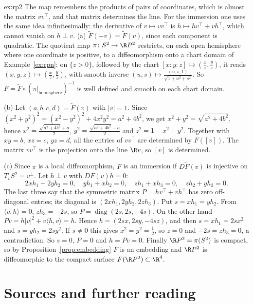 \begin{solution}{ex:rp2}
\idea The map remembers the products of pairs of coordinates, which is almost the matrix $vv^\top$, and that matrix determines the line. For the immersion
one uses the same idea infinitesimally: the derivative of $v\mapsto vv^\top$ is $h\mapsto hv^\top+vh^\top$, which cannot vanish on $h\perp v$.
\writeup (a) $\tilde F(-v)=\tilde F(v)$, since each component is quadratic. The quotient map $\pi\colon S^2\to\R P^2$ restricts, on each open hemisphere
where one coordinate is positive, to a diffeomorphism onto a chart domain of Example~\ref{ex:rpn}: on $\{z>0\}$, followed by the chart
$[x:y:z]\mapsto(\frac xz,\frac yz)$, it reads $(x,y,z)\mapsto(\frac xz,\frac yz)$, with smooth inverse $(u,s)\mapsto\frac{(u,s,1)}{\sqrt{1+u^2+s^2}}$. So
$F=\tilde F\circ(\pi|_{\text{hemisphere}})^{-1}$ is well defined and smooth on each chart domain.

(b) Let $(a,b,c,d)=\tilde F(v)$ with $|v|=1$. Since $(x^2+y^2)^2=(x^2-y^2)^2+4x^2y^2=a^2+4b^2$, we get $x^2+y^2=\sqrt{a^2+4b^2}$, hence
$x^2=\frac{\sqrt{a^2+4b^2}+a}2$, $y^2=\frac{\sqrt{a^2+4b^2}-a}2$ and $z^2=1-x^2-y^2$. Together with $xy=b$, $xz=c$, $yz=d$, all the entries of $vv^\top$ are
determined by $F([v])$. The matrix $vv^\top$ is the projection onto the line $\R v$, so $[v]$ is determined.

(c) Since $\pi$ is a local diffeomorphism, $F$ is an immersion if $D\tilde F(v)$ is injective on $T_vS^2=v^\perp$. Let $h\perp v$ with $D\tilde F(v)h=0$:
\[
2xh_1-2yh_2=0,\quad yh_1+xh_2=0,\quad zh_1+xh_3=0,\quad zh_2+yh_3=0.
\]
The last three say that the symmetric matrix $P=hv^\top+vh^\top$ has zero off-diagonal entries; its diagonal is $(2xh_1,2yh_2,2zh_3)$. Put $s=xh_1=yh_2$.
From $\langle v,h\rangle=0$, $zh_3=-2s$, so $P=\operatorname{diag}(2s,2s,-4s)$. On the other hand $Pv=h|v|^2+v\langle h,v\rangle=h$. Hence
$h=(2sx,2sy,-4sz)$, and then $s=xh_1=2sx^2$ and $s=yh_2=2sy^2$. If $s\ne0$ this gives $x^2=y^2=\frac12$, so $z=0$ and $-2s=zh_3=0$, a contradiction. So
$s=0$, $P=0$ and $h=Pv=0$. Finally $\R P^2=\pi(S^2)$ is compact, so by Proposition~\ref{prop:embedding} $F$ is an embedding and $\R P^2$ is diffeomorphic
to the compact surface $F(\R P^2)\subset\R^4$.
\end{solution}

\section*{Sources and further reading}

